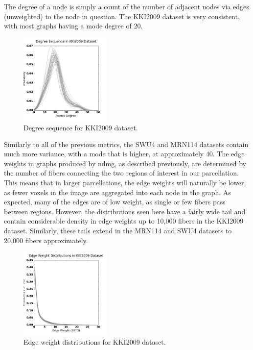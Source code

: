The degree of a node is simply a count of the number of adjacent nodes via edges (unweighted) to the node in question. The KKI2009 dataset is very consistent, with most graphs having a mode degree of 20.
\begin{figure}[h!]
\centering
\includegraphics[width=0.4\textwidth]{./stats/KKI2009-degree.png}
\makeatletter
\let\@currsize\normalsize
\caption{Degree sequence for KKI2009 dataset.}
\end{figure}
Similarly to all of the previous metrics, the SWU4 and MRN114 datasets contain much more variance, with a mode that is higher, at approximately 40.
The edge weights in graphs produced by ndmg, as described previously, are determined by the number of fibers connecting the two regions of interest in our parcellation. This means that in larger parcellations, the edge weights will naturally be lower, as fewer voxels in the image are aggregated into each node in the graph. As expected, many of the edges are of low weight, as single or few fibers pass between regions. However, the distributions seen here have a fairly wide tail and contain considerable density in edge weights up to 10,000 fibers in the KKI2009 dataset. Similarly, these tails extend in the MRN114 and SWU4 datasets to 20,000 fibers approximately.
\begin{figure}[h!]
\centering
\includegraphics[width=0.4\textwidth]{./stats/KKI2009-edgeweight.png}
\makeatletter
\let\@currsize\normalsize
\caption{Edge weight distributions for KKI2009 dataset.}
\end{figure}

